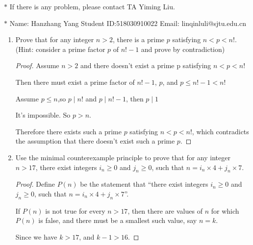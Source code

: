 \documentclass[12pt,a4paper]{article}
\theoremstyle{definition}
\begin{document}
\noindent

\noindent{}
\begin{center}
\footnotesize{\color{red}$*$ If there is any problem, please contact TA Yiming Liu.}

\footnotesize{\color{blue}$*$ Name: Hanzhang Yang  \quad Student ID:518030910022 \quad Email: linqinluli@sjtu.edu.cn}
\end{center}

\begin{enumerate}
    \item
    Prove that for any integer $n>2$, there is a prime $p$ satisfying $n<p<n!$. {\color{blue}(Hint: consider a prime factor $p$ of $n!-1$ and prove by contradiction)}
    \begin{proof}
       
        Assume  $n>2$ and there doesn't exist a prime p satisfying $n<p<n!$

       Then there must exist a prime factor of $n!-1$, $p$, and $p\le n!-1 <n!$ 
       
       Assume $p\le n$,so $p\mid n!$ and $p\mid n!-1$, then $p\mid 1$

       It's impossible. So $p>n$.

       Therefore there exists such a prime $p$ satisfying $n<p<n!$, which contradicts the assumption that there doesn't exist such a prime $p$.

   \end{proof}

    \item
    Use the minimal counterexample principle to prove that for any integer $n>17$, there exist integers $i_n\ge 0$ and $j_n\ge 0$, such that $n = i_n \times 4 + j_n \times 7$.
    \begin{proof}
        Define $P(n)$ be the statement that ``there exist integers $i_n\ge 0$ and $j_n\ge0$, such that $n=i_n\times 4 +j_n\times 7$''.
   
        If $P(n)$ is not true for every $n>17$, then there are values of $n$ for which $P(n)$ is false, and there must be a smallest such value, say $n = k$.

        Since we have $k>17$, and $k-1>16$.


\end{proof}
\end{enumerate}
\end{document}
